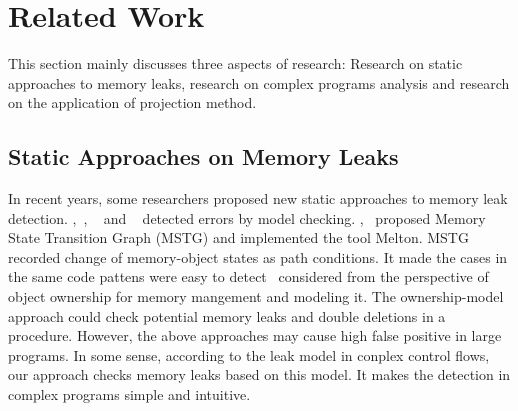 \section{Related Work}\label{sec:related}
This section mainly discusses three aspects of research: Research on static approaches to memory leaks, research on complex programs analysis and research on the application of projection method.
\subsection{Static Approaches on Memory Leaks}

In recent years, some researchers proposed new static approaches to memory leak detection. \cite{XZX11},~\cite{XZX15}, ~\cite{HL06} and ~\cite{YXYR14} detected errors by model checking. \cite{XZX11},~\cite{XZX15} proposed Memory State Transition Graph (MSTG) and implemented the tool Melton. MSTG recorded change of memory-object states as path conditions. It made the cases in the same code pattens were easy to detect~\cite{HL06} considered from the perspective of object ownership for memory mangement and modeling it. The ownership-model approach could check potential memory leaks and double deletions in a procedure. However, the above approaches may cause high false positive in large programs. In some sense, according to the leak model in conplex control flows, our approach checks memory leaks based on this model. It makes the detection in complex programs simple and intuitive. 
 
